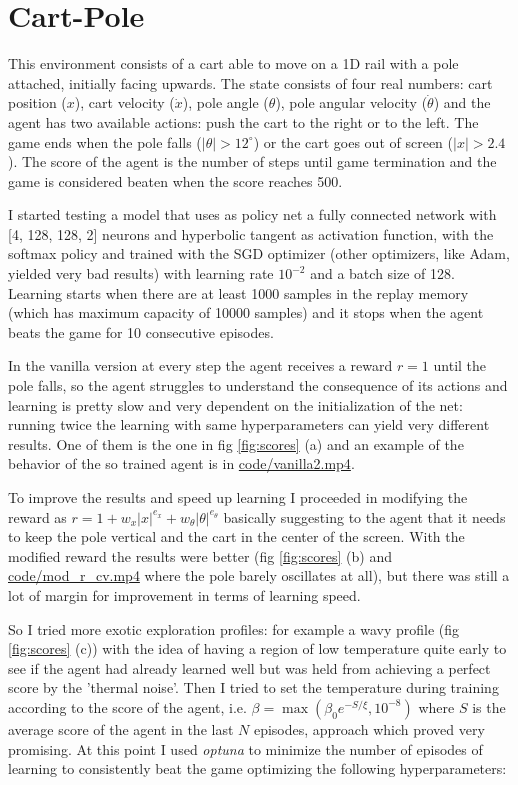 \documentclass[a4paper, 11pt]{article}
\begin{document}
\section{Cart-Pole}
  This environment consists of a cart able to move on a 1D rail with a pole attached, initially facing upwards. The state consists of four real numbers: cart position ($x$), cart velocity ($\dot{x}$), pole angle ($\theta$), pole angular velocity ($\dot{\theta}$) and the agent has two available actions: push the cart to the right or to the left. The game ends when the pole falls ($|\theta| > 12^{\circ}$) or the cart goes out of screen ($|x| > 2.4$). The score of the agent is the number of steps until game termination and the game is considered beaten when the score reaches 500.

  I started testing a model that uses as policy net a fully connected network with [4, 128, 128, 2] neurons and hyperbolic tangent as activation function, with the softmax policy and trained with the SGD optimizer (other optimizers, like Adam, yielded very bad results) with learning rate $10^{-2}$ and a batch size of 128. Learning starts when there are at least 1000 samples in the replay memory (which has maximum capacity of 10000 samples) and it stops when the agent beats the game for 10 consecutive episodes.

  In the vanilla version at every step the agent receives a reward $r = 1$ until the pole falls, so the agent struggles to understand the consequence of its actions and learning is pretty slow and very dependent on the initialization of the net: running twice the learning with same hyperparameters can yield very different results. One of them is the one in fig \ref{fig:scores} (a) and an example of the behavior of the so trained agent is in \url{code/vanilla2.mp4}.

  To improve the results and speed up learning I proceeded in modifying the reward as $r = 1 + w_x |x|^{e_x} + w_\theta |\theta|^{e_\theta}$ basically suggesting to the agent that it needs to keep the pole vertical and the cart in the center of the screen.
  With the modified reward the results were better (fig \ref{fig:scores} (b) and \url{code/mod_r_cv.mp4} where the pole barely oscillates at all), but there was still a lot of margin for improvement in terms of learning speed.

  So I tried more exotic exploration profiles: for example a wavy profile (fig \ref{fig:scores} (c)) with the idea of having a region of low temperature quite early to see if the agent had already learned well but was held from achieving a perfect score by the 'thermal noise'.
  Then I tried to set the temperature during training according to the score of the agent, i.e. $\beta = \max(\beta_0 e^{-S/\xi}, 10^{-8})$ where $S$ is the average score of the agent in the last $N$ episodes, approach which proved very promising. At this point I used \emph{optuna} to minimize the number of episodes of learning to consistently beat the game optimizing the following hyperparameters:
\end{document}
